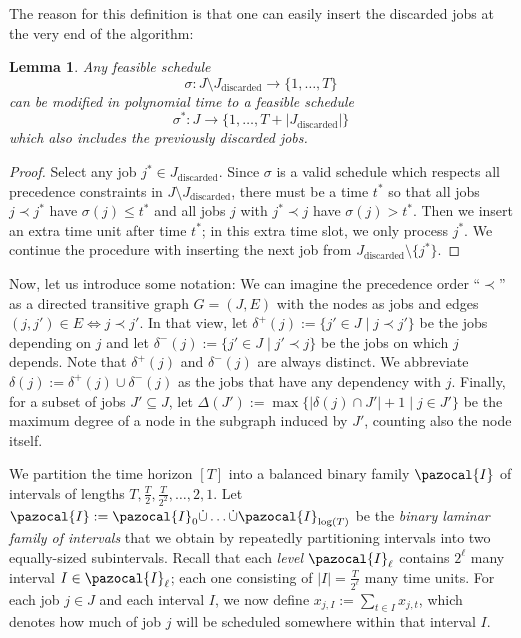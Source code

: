 \documentclass[11pt,letterpaper,oneside,english]{article}
\theoremstyle{theorem}
\newtheorem{lemma}[theorem]{Lemma}
\begin{document}
The reason for this definition is that one can easily insert the discarded jobs at the very end of the algorithm: 
\begin{lemma} \label{lem:InsertingDiscardedJobs}
Any feasible schedule 
\[
\sigma : J \setminus J_{\textrm{discarded}} \to \{1,\ldots,T\}
\] 
can be modified in polynomial time 
to a feasible schedule 
\[
\sigma^* : J \to \{ 1,\ldots,T + |J_{\textrm{discarded}}|\}
\]
which also includes the previously discarded jobs. 
\end{lemma}
\begin{proof} 
Select any job $j^* \in J_{\textrm{discarded}}$. Since $\sigma$ is a valid schedule which respects all precedence
constraints in $J \setminus J_{\textrm{discarded}}$, there must be a time $t^*$ so that all jobs $j \prec j^*$ have $\sigma(j) \leq t^*$ and 
all jobs $j$ with $j^* \prec j$ have $\sigma(j) > t^*$. Then we insert an extra time unit after time $t^*$; in
this extra time slot, we only process $j^*$. We continue the procedure with inserting the next job from $J_{\textrm{discarded}} \setminus \{j^*\}$.
\end{proof}



Now, let us introduce some notation:
We can imagine the precedence order ``$\prec$'' as a directed transitive graph $G = (J,E)$ with the nodes
as jobs and edges $(j,j') \in E \Leftrightarrow j \prec j'$. In that view, let $\delta^+(j) := \{ j' \in J \mid j \prec j'\}$ be the jobs 
depending on $j$ and let  $\delta^-(j) := \{ j' \in J \mid j' \prec j\}$ be the jobs on which $j$ depends. 
Note that $\delta^+(j)$ and $\delta^-(j)$ are always distinct. We abbreviate $\delta(j) := \delta^+(j) \cup \delta^-(j)$ 
as the jobs that have any dependency with $j$. Finally, for a subset of jobs $J' \subseteq J$, 
let $\Delta(J') := \max\{ |\delta(j) \cap J'| + 1 \mid j \in J' \}$ be the 
maximum degree of a node in the subgraph induced by $J'$, counting also the node itself. 

We partition the time horizon $[T]$ into a balanced binary family $\pazocal{I}$ of intervals of lengths $T, \frac{T}{2}, \frac{T}{2^2},\ldots,2,1$. 
Let $\pazocal{I} := \pazocal{I}_0 \dot{\cup} \ldots \dot{\cup}
\pazocal{I}_{\log(T)}$ be the \emph{binary laminar family of intervals} that
we obtain by repeatedly partitioning
intervals into two equally-sized subintervals.
Recall that each \emph{level} $\pazocal{I}_{\ell}$ contains $2^{\ell}$
many interval $I \in \pazocal{I}_{\ell}$; each one consisting
of $|I| = \frac{T}{2^{\ell}}$ many time units. 
For each job $j \in J$ and each interval $I$, we now define 
$x_{j,I} := \sum_{t \in I} x_{j,t}$, which denotes how much 
of job $j$ will be scheduled somewhere within 
that interval $I$.
\end{document}
